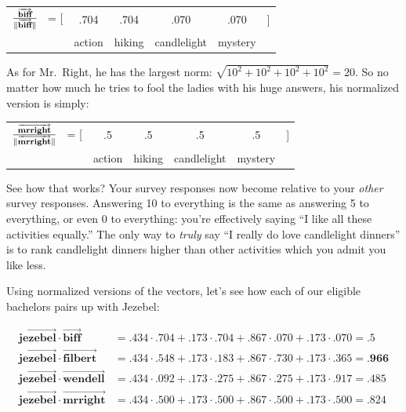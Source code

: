 \begin{center}
\begin{tabular}{cccccc}
$\frac{\overrightarrow{\textbf{biff}}}{\lVert\overrightarrow{\textbf{biff}}\rVert}$
\quad \ = [ & .704 & .704 & .070 & .070 & ] \\
& \scriptsize{action} & \scriptsize{hiking} & \scriptsize{candlelight} &
\scriptsize{mystery} & \medskip \\
\end{tabular}
\end{center}
\vspace{-.15in}

As for Mr.~Right, he has the largest norm: $\sqrt{10^2+10^2+10^2+10^2}=20$. So
no matter how much he tries to fool the ladies with his huge answers, his
normalized version is simply:

\begin{center}
\begin{tabular}{cccccc}
$\frac{\overrightarrow{\textbf{mrright}}}{\lVert\overrightarrow{\textbf{mrright}}\rVert}$
\quad \ = [ & .5 & .5 & .5 & .5 & ] \\
& \scriptsize{action} & \scriptsize{hiking} & \scriptsize{candlelight} &
\scriptsize{mystery} & \medskip \\
\end{tabular}
\end{center}
\vspace{-.15in}

See how that works? Your survey responses now become relative to your
\textit{other} survey responses. Answering 10 to everything is the
same as answering 5 to everything, or even 0 to everything: you're effectively
saying ``I like all these activities equally.'' The only way to \textit{truly}
say ``I really do love candlelight dinners'' is to rank candlelight dinners
higher than other activities which you admit you like less.

Using normalized versions of the vectors, let's see how each of our eligible
bachelors pairs up with Jezebel:

\scriptsize
\begin{align*}
\overrightarrow{\textbf{jezebel}} \cdot \overrightarrow{\textbf{biff}} &=
.434 \cdot .704 + .173 \cdot .704 + .867 \cdot .070 + .173 \cdot .070 = .5 \\
\overrightarrow{\textbf{jezebel}} \cdot \overrightarrow{\textbf{filbert}} &=
.434 \cdot .548 + .173 \cdot .183 + .867 \cdot .730  + .173 \cdot .365 =
\textbf{.966} \\
\overrightarrow{\textbf{jezebel}} \cdot \overrightarrow{\textbf{wendell}} &=
.434 \cdot .092 + .173 \cdot .275 + .867 \cdot .275 + .173 \cdot .917 = .485 \\
\overrightarrow{\textbf{jezebel}} \cdot \overrightarrow{\textbf{mrright}} &=
.434 \cdot .500 + .173 \cdot .500 + .867 \cdot .500 + .173 \cdot .500 = .824 \\
\end{align*}

